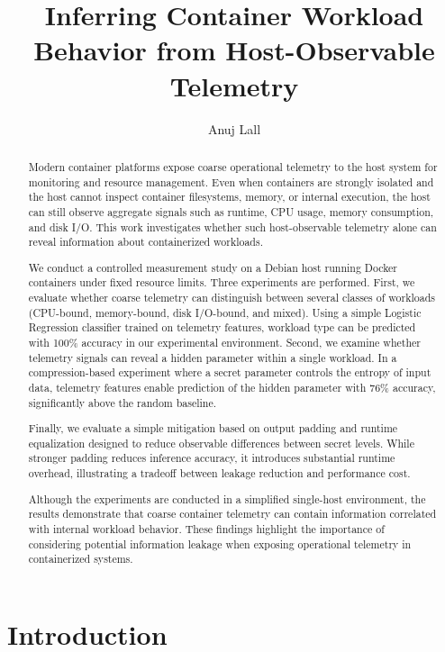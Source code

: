 \documentclass[11pt]{article}
\title{Inferring Container Workload Behavior from Host-Observable Telemetry}
\author{Anuj Lall}
\date{}
\begin{document}
\maketitle

\begin{abstract}
Modern container platforms expose coarse operational telemetry to the host system for monitoring and resource management. Even when containers are strongly isolated and the host cannot inspect container filesystems, memory, or internal execution, the host can still observe aggregate signals such as runtime, CPU usage, memory consumption, and disk I/O. This work investigates whether such host-observable telemetry alone can reveal information about containerized workloads.

We conduct a controlled measurement study on a Debian host running Docker containers under fixed resource limits. Three experiments are performed. First, we evaluate whether coarse telemetry can distinguish between several classes of workloads (CPU-bound, memory-bound, disk I/O-bound, and mixed). Using a simple Logistic Regression classifier trained on telemetry features, workload type can be predicted with 100\% accuracy in our experimental environment. Second, we examine whether telemetry signals can reveal a hidden parameter within a single workload. In a compression-based experiment where a secret parameter controls the entropy of input data, telemetry features enable prediction of the hidden parameter with 76\% accuracy, significantly above the random baseline.

Finally, we evaluate a simple mitigation based on output padding and runtime equalization designed to reduce observable differences between secret levels. While stronger padding reduces inference accuracy, it introduces substantial runtime overhead, illustrating a tradeoff between leakage reduction and performance cost.

Although the experiments are conducted in a simplified single-host environment, the results demonstrate that coarse container telemetry can contain information correlated with internal workload behavior. These findings highlight the importance of considering potential information leakage when exposing operational telemetry in containerized systems.
\end{abstract}

\section{Introduction}
\end{document}
